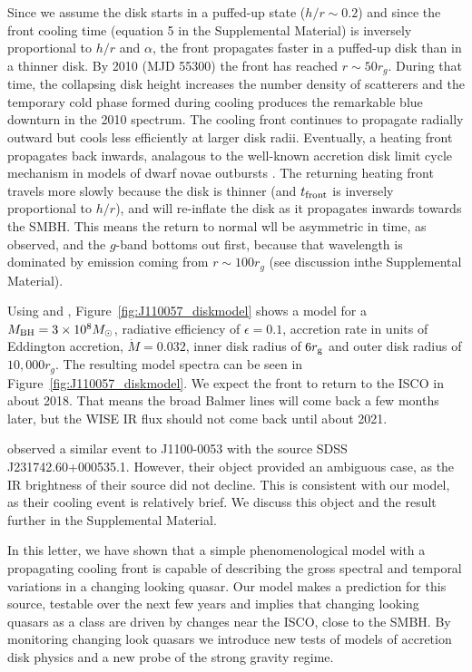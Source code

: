 \documentclass{nature}
\begin{document}
Since we assume the disk starts in a puffed-up state ($h/r \sim 0.2$) and since the front cooling time (equation 5 in the Supplemental Material) is inversely proportional to $h/r$ and $\alpha$, the front propagates faster in a puffed-up disk than in a thinner disk. By 2010 (MJD 55300) the front has reached $r\sim50 r_{g}$. During that time, the collapsing disk height increases the number density of scatterers and the temporary cold phase formed during cooling produces the remarkable blue downturn in the 2010 spectrum. The cooling front continues to propagate radially outward but cools less efficiently at larger disk radii. Eventually, a heating front propagates back inwards, analagous to the well-known accretion disk limit cycle mechanism in models of dwarf novae outbursts \cite[e.g., ][]{Cannizzo1998}. The returning heating front travels more slowly because the disk is thinner (and $t_{\rm front}$ is inversely proportional to $h/r$), and will re-inflate the disk as it propagates inwards towards the SMBH. This means the return to normal wll be asymmetric in time, as observed, and the $g$-band bottoms out first, because that wavelength is dominated by emission coming from $r\sim100r_{g}$ (see discussion inthe Supplemental Material).

Using \cite{Ford2018} and \cite{Sirko_Goodman2003}, Figure~\ref{fig:J110057_diskmodel} shows a model for a $M_{\rm BH}=3\times 10^{8} M_{\odot}$, radiative efficiency of $\epsilon=0.1$, accretion rate in units of Eddington accretion, $\dot{M}=0.032$, inner disk radius of $6r_{\rm g}$ and outer disk radius of $10,000 r_{g}$. The resulting model spectra can be seen in Figure~\ref{fig:J110057_diskmodel}.  We expect the front to return to the ISCO in about 2018. That means the broad Balmer lines will come back a few months later, but the WISE IR flux should not come back until about 2021.

\cite{Guo2016} observed a similar event to J1100-0053 with the source SDSS J231742.60+000535.1. However, their object provided an ambiguous case, as the IR brightness of their source did not decline. This is consistent with our model, as their cooling event is relatively brief.  We discuss this object and the \cite{Guo2016} result further in the Supplemental Material. 

In this letter, we have shown that a simple phenomenological model with a propagating cooling front is capable of describing the gross spectral and temporal variations in a changing looking quasar. Our model makes a prediction for this source, testable over the next few years and implies that changing looking quasars as a class are driven by changes near the ISCO, close to the SMBH. By monitoring changing look quasars we introduce new tests of models of accretion disk physics and a new probe of the strong gravity regime.
\end{document}
